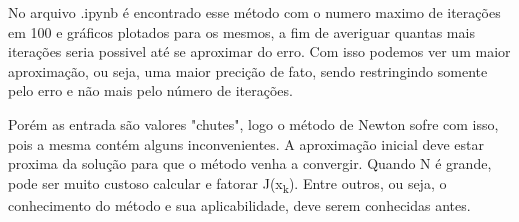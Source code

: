 \documentclass[12pt]{article}
\begin{document}
No arquivo .ipynb é encontrado esse método com o numero maximo de iterações em 100 e gráficos plotados para os mesmos, a fim de averiguar quantas mais iterações seria possivel até se aproximar do erro. Com isso podemos ver um maior aproximação, ou seja, uma maior precição de fato, sendo restringindo somente pelo erro e não mais pelo número de iterações.

Porém as entrada são valores "chutes", logo o método de Newton sofre com isso, pois a mesma contém alguns inconvenientes. A aproximação inicial deve estar proxima da solução para que o método venha a convergir. Quando N é grande, pode ser muito custoso calcular e fatorar J(x\textsubscript{k}). Entre outros, ou seja, o conhecimento do método e sua aplicabilidade, deve serem conhecidas antes.
\end{document}
